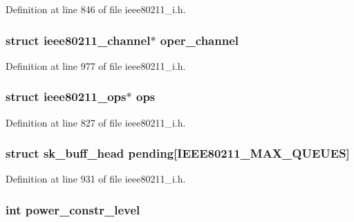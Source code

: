 Definition at line 846 of file ieee80211\-\_\-i.\-h.

\hypertarget{structieee80211__local_a298bcfc61e8403d53c2b492746b765b8}{
\subsubsection[{oper\-\_\-channel}]{\setlength{\rightskip}{0pt plus 5cm}struct ieee80211\-\_\-channel$\ast$ oper\-\_\-channel}}\label{structieee80211__local_a298bcfc61e8403d53c2b492746b765b8}


Definition at line 977 of file ieee80211\-\_\-i.\-h.

\hypertarget{structieee80211__local_a276a891dc24af93ff2578620eaa83190}{
\subsubsection[{ops}]{\setlength{\rightskip}{0pt plus 5cm}struct ieee80211\-\_\-ops$\ast$ ops}}\label{structieee80211__local_a276a891dc24af93ff2578620eaa83190}


Definition at line 827 of file ieee80211\-\_\-i.\-h.

\hypertarget{structieee80211__local_a1af46fe8e85323cc129ada2186925c51}{
\subsubsection[{pending}]{\setlength{\rightskip}{0pt plus 5cm}struct sk\-\_\-buff\-\_\-head pending\mbox{[}I\-E\-E\-E80211\-\_\-\-M\-A\-X\-\_\-\-Q\-U\-E\-U\-E\-S\mbox{]}}}\label{structieee80211__local_a1af46fe8e85323cc129ada2186925c51}


Definition at line 931 of file ieee80211\-\_\-i.\-h.

\hypertarget{structieee80211__local_ad1b75d23d03dca9da09d4d091c904e8f}{
\subsubsection[{power\-\_\-constr\-\_\-level}]{\setlength{\rightskip}{0pt plus 5cm}int power\-\_\-constr\-\_\-level}}\label{structieee80211__local_ad1b75d23d03dca9da09d4d091c904e8f}


